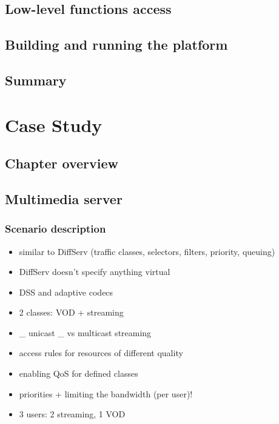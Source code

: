\documentclass[11pt]{book}
\begin{document}
    \section{Low-level functions access}


    \section{Building and running the platform}


    \section*{Summary}


  \chapter{Case Study}

    \section*{Chapter overview}


    \section{Multimedia server}

      \subsection{Scenario description}

        \begin{itemize}
          \item similar to DiffServ (traffic classes, selectors, filters, priority, queuing)
          \item DiffServ doesn't specify anything virtual
          \item DSS and adaptive codecs
        \end{itemize}

        \begin{itemize}
          \item 2 classes: VOD + streaming
          \item \_ unicast \_ vs multicast streaming
          \item access rules for resources of different quality
          \item enabling QoS for defined classes
          \item priorities + limiting the bandwidth (per user)!
          \item 3 users: 2 streaming, 1 VOD
        \end{itemize}
\end{document}

